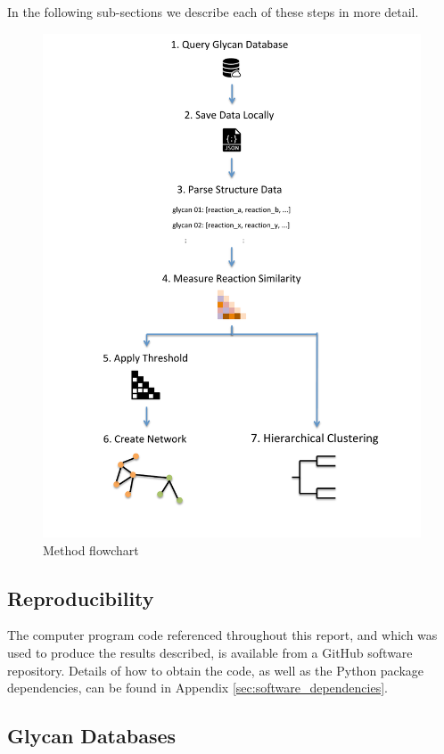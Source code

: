 \documentclass[12pt,a4paper]{article}
\begin{document}
In the following sub-sections we describe each of these steps in more detail.

\begin{figure}[H]
\centering 
\includegraphics[scale=0.83]{images/flowchart.pdf} 
\caption{Method flowchart}
\label{fig:flowchart}
\end{figure}

\subsection{Reproducibility}
\label{sec:reproducibility}
The computer program code referenced throughout this report, and which was used to produce the results described, is available from a GitHub software repository. Details of how to obtain the code, as well as the Python package dependencies, can be found in Appendix \ref{sec:software_dependencies}. 

\subsection{Glycan Databases}
\label{sec:glycan_databases}
\end{document}

